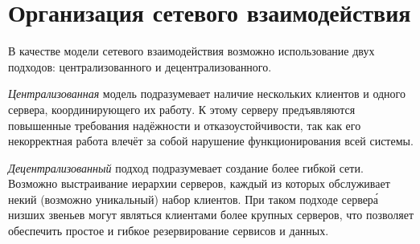 \section{Организация сетевого взаимодействия} \label{technologic_network}

В качестве модели сетевого взаимодействия возможно использование двух подходов: централизованного и децентрализованного.

\vspace{\baselineskip}
\textit{Централизованная} модель подразумевает наличие нескольких клиентов и одного сервера, координирующего их работу. К этому серверу предъявляются повышенные требования надёжности и отказоустойчивости, так как его некорректная работа влечёт за собой нарушение функционирования всей системы.

\vspace{\baselineskip}
\textit{Децентрализованный} подход подразумевает создание более гибкой сети. Возможно выстраивание иерархии серверов, каждый из которых обслуживает некий (возможно уникальный) набор клиентов. При таком подходе сервер\'{а} низших звеньев могут являться клиентами более крупных серверов, что позволяет обеспечить простое и гибкое резервирование сервисов и данных.